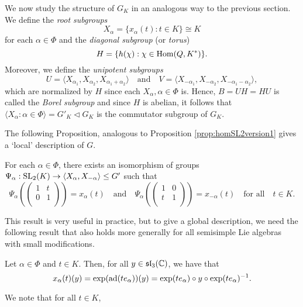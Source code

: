 We now study the structure of $G_K$ in an analogous way to the previous section. We define the \textit{root subgroups} $$X_\alpha=\{x_\alpha(t):t\in K\}\cong K$$ for each $\alpha\in\Phi$ and the \textit{diagonal subgroup} (or \textit{torus}) $$H=\{h(\chi):\chi\in\mathrm{Hom}(Q,K^*)\}.$$ Moreover, we define the \textit{unipotent subgroups} 
$$U=\langle X_{\alpha_1},X_{\alpha_2},X_{\alpha_1+\alpha_2}\rangle\quad\text{and}\quad V=\langle X_{-\alpha_1},X_{-\alpha_2},X_{-\alpha_1-\alpha_2}\rangle,$$
which are normalized by $H$ since each $X_\alpha, \alpha\in\Phi$ is. Hence, $B=UH=HU$ is called the \textit{Borel subgroup} and since $H$ is abelian, it follows that $\langle X_\alpha:\alpha\in\Phi\rangle=G'_K\triangleleft G_K$ is the commutator subgroup of $G_K$.

The following Proposition, analogous to Proposition \ref{prop:homSL2version1} gives a `local' description of $G$.

\begin{proposition}
    For each $\alpha\in\Phi$, there exists an isomorphism of groups 
    $\Psi_\alpha:\mathrm{SL}_2(K)\rightarrow\langle X_\alpha,X_{-\alpha}\rangle\leq G'$
    such that 
    $$\Psi_\alpha\left(\begin{pmatrix}
        1 & t\\
        0 & 1\\
    \end{pmatrix}\right)=x_\alpha(t)\quad\text{and}\quad\Psi_\alpha\left(\begin{pmatrix}
        1 & 0\\
        t & 1\\
    \end{pmatrix}\right)=x_{-\alpha}(t)\quad\text{for all}\quad t\in K.$$
\end{proposition}

This result is very useful in practice, but to give a global description, we need the following result that also holds more generally for all semisimple Lie algebras with small modifications.

\begin{lemma}
    Let $\alpha\in\Phi$ and $t\in K$. Then, for all $y\in\mathfrak{sl}_3(\mathbb{C})$, we have that 
    $$x_\alpha(t)(y)=\exp(\mathrm{ad}(t e_\alpha))(y)=\exp(te_\alpha)\circ y\circ \exp(te_\alpha)^{-1}.$$
\end{lemma}

We note that for all $t\in K$,

